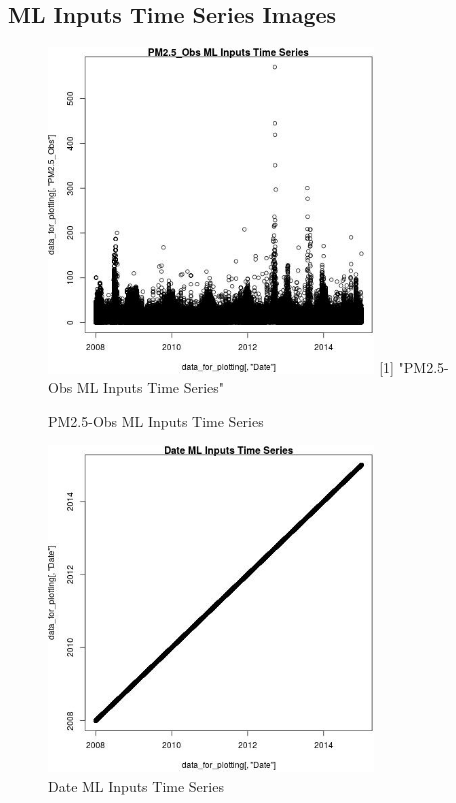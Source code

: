 
\subsection{ML Inputs Time Series Images} 
 

\begin{figure} 
\centering  
\includegraphics[width=0.77\textwidth]{Code_Outputs/ML_input_report_ML_input_PM25_Step5_part_d_de_duplicated_aves_ML_input_PM2.5_ObsTS.jpg} 
[1] "PM2.5-Obs ML Inputs Time Series"
\caption{\label{fig:ML_input_report_ML_input_PM25_Step5_part_d_de_duplicated_aves_ML_inputPM2.5_ObsTS}PM2.5-Obs ML Inputs Time Series} 
\end{figure} 
 

\begin{figure} 
\centering  
\includegraphics[width=0.77\textwidth]{Code_Outputs/ML_input_report_ML_input_PM25_Step5_part_d_de_duplicated_aves_ML_input_DateTS.jpg} 
\caption{\label{fig:ML_input_report_ML_input_PM25_Step5_part_d_de_duplicated_aves_ML_inputDateTS}Date ML Inputs Time Series} 
\end{figure} 
 

